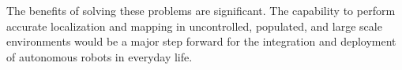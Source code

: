 
The benefits of solving these problems are significant. The capability to perform accurate localization and mapping in uncontrolled, populated, and large scale environments would be a major step forward for the integration and deployment of autonomous robots in everyday life.